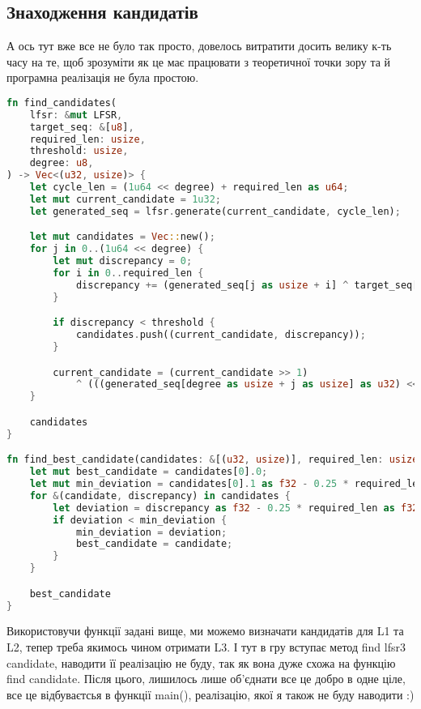 \documentclass[12pt]{article}
\begin{document}
\subsection{Знаходження кандидатів}
\quad А ось тут вже все не було так просто, довелось витратити досить велику к-ть часу на те, щоб зрозуміти як це має працювати з теоретичної точки зору та й програмна реалізація не була простою.
\begin{lstlisting}[language=Rust]
fn find_candidates(
    lfsr: &mut LFSR,
    target_seq: &[u8],
    required_len: usize,
    threshold: usize,
    degree: u8,
) -> Vec<(u32, usize)> {
    let cycle_len = (1u64 << degree) + required_len as u64;
    let mut current_candidate = 1u32;
    let generated_seq = lfsr.generate(current_candidate, cycle_len);

    let mut candidates = Vec::new();
    for j in 0..(1u64 << degree) {
        let mut discrepancy = 0;
        for i in 0..required_len {
            discrepancy += (generated_seq[j as usize + i] ^ target_seq[i]) as usize;
        }

        if discrepancy < threshold {
            candidates.push((current_candidate, discrepancy));
        }

        current_candidate = (current_candidate >> 1)
            ^ (((generated_seq[degree as usize + j as usize] as u32) << (degree - 1)) as u32);
    }

    candidates
}

fn find_best_candidate(candidates: &[(u32, usize)], required_len: usize) -> u32 {
    let mut best_candidate = candidates[0].0;
    let mut min_deviation = candidates[0].1 as f32 - 0.25 * required_len as f32;
    for &(candidate, discrepancy) in candidates {
        let deviation = discrepancy as f32 - 0.25 * required_len as f32;
        if deviation < min_deviation {
            min_deviation = deviation;
            best_candidate = candidate;
        }
    }

    best_candidate
}
\end{lstlisting}

\quad Використовучи функції задані вище, ми можемо визначати кандидатів для L1 та L2, тепер треба якимось чином отримати L3. І тут в гру вступає метод find lfsr3 candidate, наводити її реалізацію не буду, так як вона дуже схожа на функцію find candidate. Після цього, лишилось лише об'єднати все це добро в одне ціле, все це відбуваєтсья в функції main(), реалізацію, якої я також не буду наводити :)
\end{document}

